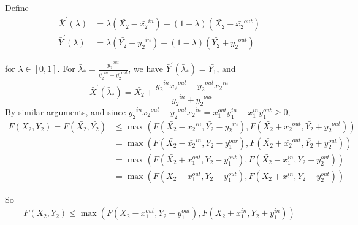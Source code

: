 \documentclass{article}
\theoremstyle{case}
\begin{document}
Define
\begin{align*}
\bar{X}^\prime\left( \lambda \right) & = \lambda \left( \bar{X_2} - \bar{x_2}^{in}\right) + \left( 1 - \lambda\right) \left( \bar{X_2} + \bar{x_2}^{out}\right) \\
\bar{Y}^\prime\left( \lambda \right) & = \lambda \left( \bar{Y_2} - \bar{y_2}^{in}\right) + \left( 1 - \lambda\right) \left( \bar{Y_2} + \bar{y_2}^{out}\right)
\end{align*}

for $\lambda \in \left[ 0,1\right]$. For $\bar{\lambda}_{*} = \frac{\bar{y_2}^{out}}{\bar{y_2}^{in} + \bar{y_2}^{out}}$, we have $\bar{Y}^\prime\left( \bar{\lambda}_{*}\right) = \bar{Y_1}$, and 
\[\bar{X}^\prime\left( \bar{\lambda}_{*}\right) = \bar{X_2} + \frac{\bar{y_2}^{in}\bar{x_2}^{out}-\bar{y_2}^{out}\bar{x_2}^{in}}{\bar{y_2}^{in} + \bar{y_2}^{out}}\]
By similar arguments, and since $\bar{y_2}^{in}\bar{x_2}^{out}-\bar{y_2}^{out}\bar{x_2}^{in} = x_1^{out}y_1^{in} - x_1^{in}y_1^{out} \geq 0$, 
\begin{align*}
F(X_2, Y_2) = F(\bar{X_2}, \bar{Y_2}) & \leq \max{\left(F(\bar{X_2}-\bar{x_2}^{in},\bar{Y_2}-\bar{y_2}^{in}), F(\bar{X_2}+\bar{x_2}^{out},\bar{Y_2}+\bar{y_2}^{out})\right)} \\
& = \max{\left(F(\bar{X_2}-\bar{x_2}^{in},Y_2-y_1^{our}), F(\bar{X_2}+\bar{x_2}^{out},\bar{Y_2}+y_2^{out})\right)} \\
& = \max{\left(F(\bar{X_2} +x_1^{out},Y_2-y_1^{out}), F(\bar{X_2}-x_1^{in},Y_2+y_2^{out})\right)} \\
& = \max{\left(F(X_2 -x_1^{out},Y_2-y_1^{out}), F(X_2+x_1^{in},Y_2+y_2^{out})\right)}
\end{align*}

So
\begin{align} \label{eq4}
F(X_2, Y_2) \leq \max{\left(F(X_2-x_1^{out},Y_2-y_1^{out}), F(X_2+x_1^{in},Y_2+y_1^{in})\right)}
\end{align}
\end{document}
